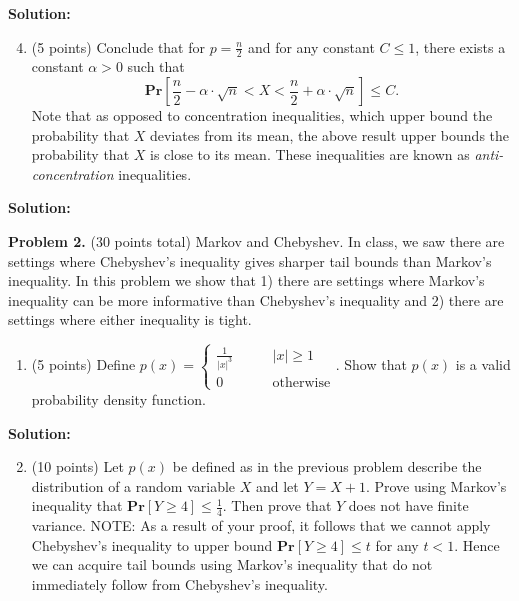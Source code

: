 \documentclass[11pt]{article}
\newcommand{\PPr}[1]{\ensuremath{\mathbf{Pr}\left[#1\right]}}
\begin{document}
\noindent\textbf{Solution:}








\begin{enumerate}
\setcounter{enumi}{3}
\item (5 points)
Conclude that for $p=\frac{n}{2}$ and for any constant $C\le 1$, there exists a constant $\alpha>0$ such that
\[\PPr{\frac{n}{2}-\alpha\cdot\sqrt{n}<X<\frac{n}{2}+\alpha\cdot\sqrt{n}}\le C.\]
Note that as opposed to concentration inequalities, which upper bound the probability that $X$ deviates from its mean, the above result upper bounds the probability that $X$ is close to its mean. These inequalities are known as \emph{anti-concentration} inequalities. 
\end{enumerate}

\noindent\textbf{Solution:}







\newpage\noindent
\textbf{Problem 2.} (30 points total)
Markov and Chebyshev.
\vskip 0.1in\noindent
In class, we saw there are settings where Chebyshev's inequality gives sharper tail bounds than Markov's inequality. In this problem we show that 1) there are settings where Markov's inequality can be more informative than Chebyshev's inequality and 2) there are settings where either inequality is tight. 
\begin{enumerate}
\item (5 points)
Define $p(x)=\begin{cases}\frac{1}{|x|^3}\qquad&|x|\ge 1\\
0\qquad&\text{otherwise}\end{cases}$. 
\vskip 0.1in\noindent
Show that $p(x)$ is a valid probability density function. 
\end{enumerate}

\noindent\textbf{Solution:}


\begin{enumerate}
\setcounter{enumi}{1}
\item (10 points)
Let $p(x)$ be defined as in the previous problem describe the distribution of a random variable $X$ and let $Y=X+1$. 
Prove using Markov's inequality that $\PPr{Y\ge 4}\le\frac{1}{4}$. 
Then prove that $Y$ does not have finite variance. 
\vskip 0.1in\noindent
NOTE: As a result of your proof, it follows that we cannot apply Chebyshev's inequality to upper bound $\PPr{Y\ge 4}\le t$ for any $t<1$. Hence we can acquire tail bounds using Markov's inequality that do not immediately follow from Chebyshev's inequality.
\end{enumerate}
\end{document}
